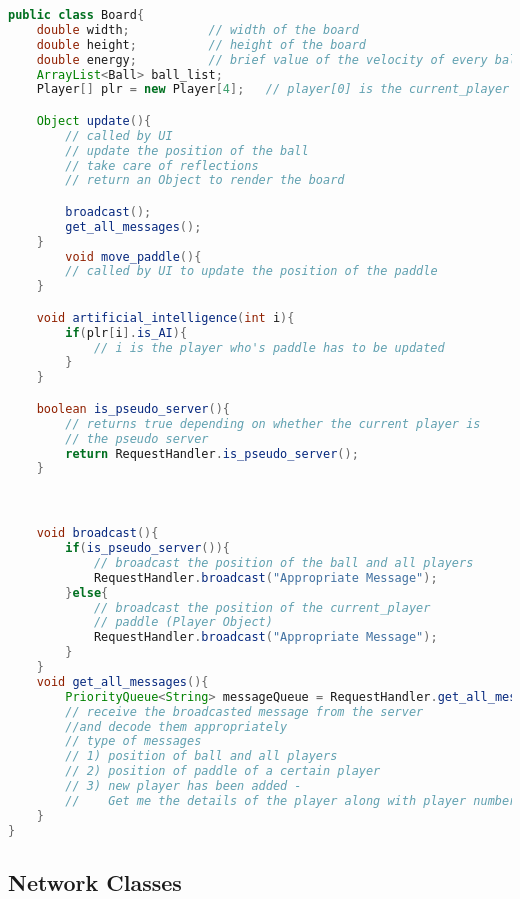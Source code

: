 \documentclass{article}
\begin{document}
\begin{lstlisting}[language=Java, caption={Class Parameters for Board}]
public class Board{
	double width;			// width of the board
	double height;			// height of the board
	double energy;			// brief value of the velocity of every ball
	ArrayList<Ball> ball_list;
	Player[] plr = new Player[4];	// player[0] is the current_player

	Object update(){
	    // called by UI
		// update the position of the ball
		// take care of reflections
		// return an Object to render the board

		broadcast();
		get_all_messages();
	}
		void move_paddle(){
		// called by UI to update the position of the paddle
	}

	void artificial_intelligence(int i){
		if(plr[i].is_AI){
			// i is the player who's paddle has to be updated
		}
	}

	boolean is_pseudo_server(){
		// returns true depending on whether the current player is 
		// the pseudo server
		return RequestHandler.is_pseudo_server();
	}



	void broadcast(){
		if(is_pseudo_server()){
			// broadcast the position of the ball and all players
			RequestHandler.broadcast("Appropriate Message");
		}else{
			// broadcast the position of the current_player 
			// paddle (Player Object)
			RequestHandler.broadcast("Appropriate Message");
		}
	}
	void get_all_messages(){
		PriorityQueue<String> messageQueue = RequestHandler.get_all_messages();
		// receive the broadcasted message from the server 
		//and decode them appropriately
		// type of messages
		// 1) position of ball and all players
		// 2) position of paddle of a certain player
		// 3) new player has been added - 
		//    Get me the details of the player along with player number
	}
}
\end{lstlisting}

\subsection{Network Classes}
\end{document}
